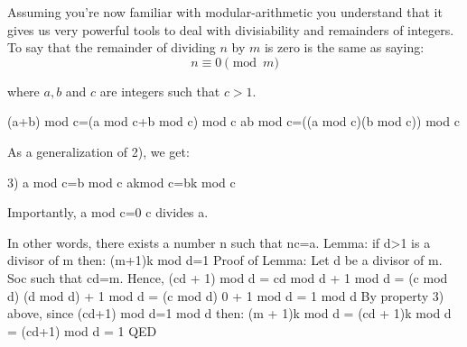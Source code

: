 \documentclass{article}
\begin{document}
%
%
%

Assuming you're now familiar with modular-arithmetic you understand
that it gives us very powerful tools to deal with divisiability
and remainders of integers.
To say that 
the remainder of
dividing $n$ by $m$
is zero is the same as saying:
\[n \equiv 0 \pmod{m}\]



where $a,b$ and $c$ are
integers such that $c>1$.

(a+b) mod c=(a mod c+b mod c) mod c
ab mod c=((a mod c)(b mod c)) mod c

As a generalization of 2), we get:

3) a mod c=b mod c akmod c=bk mod c

Importantly, a mod c=0 c divides a.

In other words, there exists a number n such that nc=a.
Lemma:
if d>1 is a divisor of m then:
(m+1)k mod d=1
Proof of Lemma:
Let d be a divisor of m. Soc such that cd=m.
Hence, (cd + 1) mod d = cd mod d + 1 mod d
= (c mod d) (d mod d) + 1 mod d
= (c mod d) 0 + 1 mod d
= 1 mod d
By property 3) above, since (cd+1) mod d=1 mod d then:
(m + 1)k mod d
= (cd + 1)k mod d
= (cd+1) mod d
= 1
QED
\end{document}
